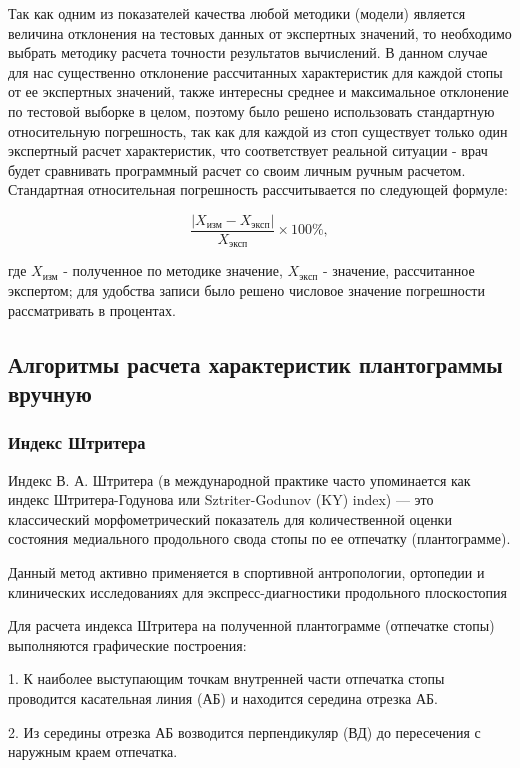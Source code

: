 \documentclass[coursework]{SCWorks}
\begin{document}
Так как одним из показателей качества любой методики (модели) является величина отклонения на тестовых данных от экспертных значений, то необходимо выбрать методику расчета точности результатов вычислений. В данном случае для нас существенно отклонение рассчитанных характеристик для каждой стопы от ее экспертных значений, также интересны среднее и максимальное отклонение по тестовой выборке в целом, поэтому было решено использовать стандартную относительную погрешность, так как для каждой из стоп существует только один экспертный расчет характеристик, что соответствует реальной ситуации - врач будет сравнивать программный расчет со своим личным ручным расчетом. Стандартная относительная погрешность рассчитывается по следующей формуле:

\begin{equation}
\frac{|X_{\text{изм}} - X_{\text{эксп}}|}{X_{\text{эксп}}} \times 100\%,
\end{equation}

где \(X_{\text{изм}}\) - полученное по методике значение, \(X_{\text{эксп}}\) - значение, рассчитанное экспертом; для удобства записи было решено числовое значение погрешности рассматривать в процентах.

\subsection{Алгоритмы расчета характеристик плантограммы вручную}
\subsubsection{Индекс Штритера}
Индекс В. А. Штритера (в международной практике часто упоминается как индекс Штритера-Годунова или Sztriter-Godunov (KY) index) — это классический морфометрический показатель для количественной оценки состояния медиального продольного свода стопы по ее отпечатку (плантограмме).

Данный метод активно применяется в спортивной антропологии, ортопедии и клинических исследованиях для экспресс-диагностики продольного плоскостопия

Для расчета индекса Штритера на полученной плантограмме (отпечатке стопы) выполняются графические построения:

1. К наиболее выступающим точкам внутренней части отпечатка стопы проводится
касательная линия (АБ) и находится середина отрезка АБ.

2. Из середины отрезка АБ возводится перпендикуляр (ВД) до пересечения с
наружным краем отпечатка.
\end{document}
